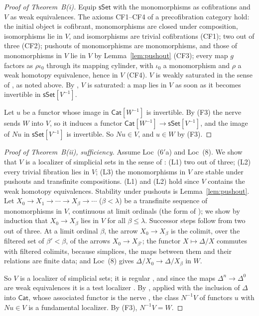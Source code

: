 \documentclass[11pt,a4paper]{article}
\theoremstyle{definition}
\newcommand{\Cat}{\mathsf{Cat}}
\newcommand{\sSet}{\mathsf{sSet}}
\begin{document}
\begin{proof}[Proof of Theorem~B(i)]
Equip $\sSet$ with the monomorphisms as cofibrations and $V$ as weak equivalences. The axioms
CF1--CF4 of a precofibration category \cite[Def.~1.1.1]{RB09} hold: the initial object is
cofibrant, monomorphisms are closed under composition, isomorphisms lie in $V$, and isomorphisms
are trivial cofibrations (CF1); two out of three (CF2); pushouts of monomorphisms are
monomorphisms, and those of monomorphisms in $V$ lie in $V$ by Lemma~\ref{lem:pushout} (CF3);
every map $g$ factors as $\rho\iota_0$ through its mapping cylinder, with $\iota_0$ a
monomorphism and $\rho$ a weak homotopy equivalence, hence in $V$ (CF4). $V$ is weakly saturated
in the sense of \cite[Def.~7.2.6]{RB09}, as noted above. By \cite[Th.~7.2.7]{RB09}, $V$ is
saturated: a map lies in $V$ as soon as it becomes invertible in $\sSet[V^{-1}]$.

Let $u$ be a functor whose image in $\Cat[W^{-1}]$ is invertible. By (F3) the nerve sends $W$
into $V$, so it induces a functor $\Cat[W^{-1}]\to\sSet[V^{-1}]$, and the image of $Nu$ in
$\sSet[V^{-1}]$ is invertible. So $Nu\in V$, and $u\in W$ by (F3).
\end{proof}

\begin{proof}[Proof of Theorem~B(ii), sufficiency]
Assume Loc~($6'$a) and Loc~(8). We show that $V$ is a localizer of simplicial sets in the sense of
\cite[D\'ef.~1.4.1]{Cis06}: (L1) two out of three; (L2) every trivial fibration lies in $V$;
(L3) the monomorphisms in $V$ are stable under pushouts and transfinite compositions. (L1) and
(L2) hold since $V$ contains the weak homotopy equivalences. Stability under pushouts is
Lemma~\ref{lem:pushout}. Let $X_0\to X_1\to\cdots\to X_\beta\to\cdots$ ($\beta<\lambda$) be a
transfinite sequence of monomorphisms in $V$, continuous at limit ordinals (the form of \cite[Rem.~1.1.3]{Cis06}); we show by induction
that $X_0\to X_\beta$ lies in $V$ for all $\beta\le\lambda$. Successor steps follow from two out of
three. At a limit ordinal $\beta$, the arrow $X_0\to X_\beta$ is the colimit, over the filtered
set of $\beta'<\beta$, of the arrows $X_0\to X_{\beta'}$; the functor $X\mapsto\Delta/X$ commutes
with filtered colimits, because simplices, the maps between them and their relations are finite
data; and Loc~(8) gives $\Delta/X_0\to\Delta/X_\beta$ in $W$.

So $V$ is a localizer of simplicial sets; it is regular \cite[Prop.~3.4.25]{Cis06}, and since the
maps $\Delta^n\to\Delta^0$ are weak equivalences it is a test localizer
\cite[D\'ef.~4.2.11]{Cis06}. By \cite[Th.~4.2.15 and Rem.~4.2.16]{Cis06}, applied with the
inclusion of $\Delta$ into $\Cat$, whose associated functor is the nerve \cite[Ex.~4.1.29]{Cis06},
the class $N^{-1}V$ of functors $u$ with $Nu\in V$ is a fundamental localizer. By (F3),
$N^{-1}V=W$.
\end{proof}
\end{document}
